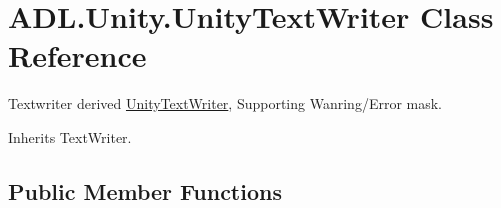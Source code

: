 \hypertarget{class_a_d_l_1_1_unity_1_1_unity_text_writer}{}\section{A\+D\+L.\+Unity.\+Unity\+Text\+Writer Class Reference}
\label{class_a_d_l_1_1_unity_1_1_unity_text_writer}


Textwriter derived \mbox{\hyperlink{class_a_d_l_1_1_unity_1_1_unity_text_writer}{Unity\+Text\+Writer}}, Supporting Wanring/\+Error mask.  




Inherits Text\+Writer.

\subsection*{Public Member Functions}
